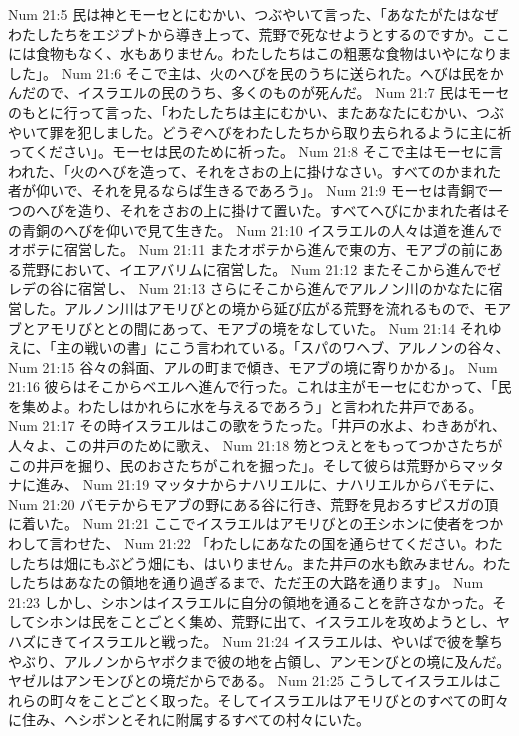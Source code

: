 Num 21:5  民は神とモーセとにむかい、つぶやいて言った、「あなたがたはなぜわたしたちをエジプトから導き上って、荒野で死なせようとするのですか。ここには食物もなく、水もありません。わたしたちはこの粗悪な食物はいやになりました」。
Num 21:6  そこで主は、火のへびを民のうちに送られた。へびは民をかんだので、イスラエルの民のうち、多くのものが死んだ。
Num 21:7  民はモーセのもとに行って言った、「わたしたちは主にむかい、またあなたにむかい、つぶやいて罪を犯しました。どうぞへびをわたしたちから取り去られるように主に祈ってください」。モーセは民のために祈った。
Num 21:8  そこで主はモーセに言われた、「火のへびを造って、それをさおの上に掛けなさい。すべてのかまれた者が仰いで、それを見るならば生きるであろう」。
Num 21:9  モーセは青銅で一つのへびを造り、それをさおの上に掛けて置いた。すべてへびにかまれた者はその青銅のへびを仰いで見て生きた。
Num 21:10  イスラエルの人々は道を進んでオボテに宿営した。
Num 21:11  またオボテから進んで東の方、モアブの前にある荒野において、イエアバリムに宿営した。
Num 21:12  またそこから進んでゼレデの谷に宿営し、
Num 21:13  さらにそこから進んでアルノン川のかなたに宿営した。アルノン川はアモリびとの境から延び広がる荒野を流れるもので、モアブとアモリびととの間にあって、モアブの境をなしていた。
Num 21:14  それゆえに、「主の戦いの書」にこう言われている。「スパのワヘブ、アルノンの谷々、
Num 21:15  谷々の斜面、アルの町まで傾き、モアブの境に寄りかかる」。
Num 21:16  彼らはそこからベエルへ進んで行った。これは主がモーセにむかって、「民を集めよ。わたしはかれらに水を与えるであろう」と言われた井戸である。
Num 21:17  その時イスラエルはこの歌をうたった。「井戸の水よ、わきあがれ、人々よ、この井戸のために歌え、
Num 21:18  笏とつえとをもってつかさたちがこの井戸を掘り、民のおさたちがこれを掘った」。そして彼らは荒野からマッタナに進み、
Num 21:19  マッタナからナハリエルに、ナハリエルからバモテに、
Num 21:20  バモテからモアブの野にある谷に行き、荒野を見おろすピスガの頂に着いた。
Num 21:21  ここでイスラエルはアモリびとの王シホンに使者をつかわして言わせた、
Num 21:22  「わたしにあなたの国を通らせてください。わたしたちは畑にもぶどう畑にも、はいりません。また井戸の水も飲みません。わたしたちはあなたの領地を通り過ぎるまで、ただ王の大路を通ります」。
Num 21:23  しかし、シホンはイスラエルに自分の領地を通ることを許さなかった。そしてシホンは民をことごとく集め、荒野に出て、イスラエルを攻めようとし、ヤハズにきてイスラエルと戦った。
Num 21:24  イスラエルは、やいばで彼を撃ちやぶり、アルノンからヤボクまで彼の地を占領し、アンモンびとの境に及んだ。ヤゼルはアンモンびとの境だからである。
Num 21:25  こうしてイスラエルはこれらの町々をことごとく取った。そしてイスラエルはアモリびとのすべての町々に住み、ヘシボンとそれに附属するすべての村々にいた。
